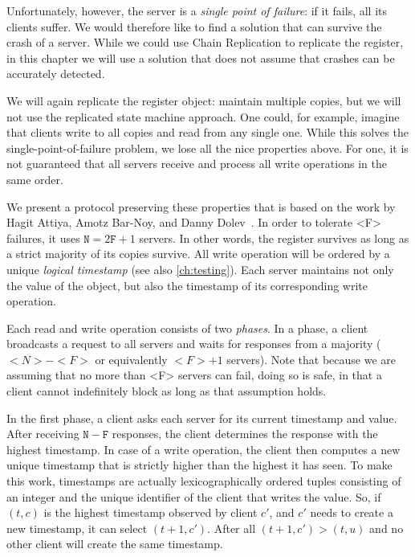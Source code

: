 \documentclass{report}
\begin{document}
%
Unfortunately, however, the server is a \emph{single point of failure}:
if it fails, all its clients suffer.
We would therefore like to find a solution that can survive the crash
of a server.
While we could use Chain Replication to replicate the register, in
this chapter we will use a solution that does not assume that
crashes can be accurately detected.

We will again replicate the register object: maintain multiple copies,
but we will not use the replicated state machine approach.
One could, for example, imagine that clients write to all copies and read
from any single one.
While this solves the single-point-of-failure problem, we lose all the
nice properties above.  For one, it is not guaranteed that all servers
receive and process all write operations in the same order.

%
We present a protocol preserving these properties that is based on the
work by Hagit Attiya, Amotz Bar-Noy, and Danny Dolev~\cite{ABD95}.
In order to tolerate <{F}> failures,
it uses $\mathtt{N} = 2\mathtt{F} + 1$ servers.
In other words, the register survives as long as a strict majority of
its copies survive.
All write operation will be ordered by a unique \emph{logical timestamp}
(see also \autoref{ch:testing}).
Each server maintains not only the value of the object, but also the
timestamp of its corresponding write operation.

Each read and write operation consists of two \emph{phases}.  In a phase,
a client broadcasts a request to all servers and waits for responses
from a majority ($<{N}> - <{F}>$ or equivalently
$<{F}> + 1$ servers).  Note that because we are assuming that no
more than <{F}> servers can fail, doing so is safe, in that a client
cannot indefinitely block as long as that assumption holds.

In the first phase, a client asks each server for its current
timestamp and value.  After receiving $\mathtt{N} - \mathtt{F}$ responses,
the client determines the response with the highest timestamp.
In case of a write operation, the client then computes a new unique
timestamp that is strictly higher than the highest it has seen.
To make this work, timestamps are actually lexicographically ordered
tuples consisting of an integer and the unique identifier of the
client that writes the value.  So, if $(t, c)$ is the highest timestamp
observed by client $c'$, and $c'$  needs to create a new timestamp,
it can select $(t + 1, c')$.
After all $(t + 1, c') > (t, u)$ and no other client
will create the same timestamp.
\end{document}
